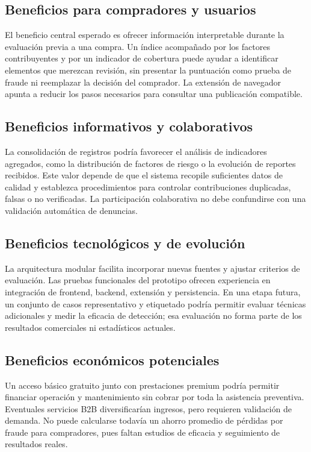 \subsection{Beneficios para compradores y usuarios}

El beneficio central esperado es ofrecer información interpretable durante la evaluación previa a una compra. Un índice acompañado por los factores contribuyentes y por un indicador de cobertura puede ayudar a identificar elementos que merezcan revisión, sin presentar la puntuación como prueba de fraude ni reemplazar la decisión del comprador. La extensión de navegador apunta a reducir los pasos necesarios para consultar una publicación compatible.

\subsection{Beneficios informativos y colaborativos}

La consolidación de registros podría favorecer el análisis de indicadores agregados, como la distribución de factores de riesgo o la evolución de reportes recibidos. Este valor depende de que el sistema recopile suficientes datos de calidad y establezca procedimientos para controlar contribuciones duplicadas, falsas o no verificadas. La participación colaborativa no debe confundirse con una validación automática de denuncias.

\subsection{Beneficios tecnológicos y de evolución}

La arquitectura modular facilita incorporar nuevas fuentes y ajustar criterios de evaluación. Las pruebas funcionales del prototipo ofrecen experiencia en integración de frontend, backend, extensión y persistencia. En una etapa futura, un conjunto de casos representativo y etiquetado podría permitir evaluar técnicas adicionales y medir la eficacia de detección; esa evaluación no forma parte de los resultados comerciales ni estadísticos actuales.

\subsection{Beneficios económicos potenciales}

Un acceso básico gratuito junto con prestaciones premium podría permitir financiar operación y mantenimiento sin cobrar por toda la asistencia preventiva. Eventuales servicios B2B diversificarían ingresos, pero requieren validación de demanda. No puede calcularse todavía un ahorro promedio de pérdidas por fraude para compradores, pues faltan estudios de eficacia y seguimiento de resultados reales.

